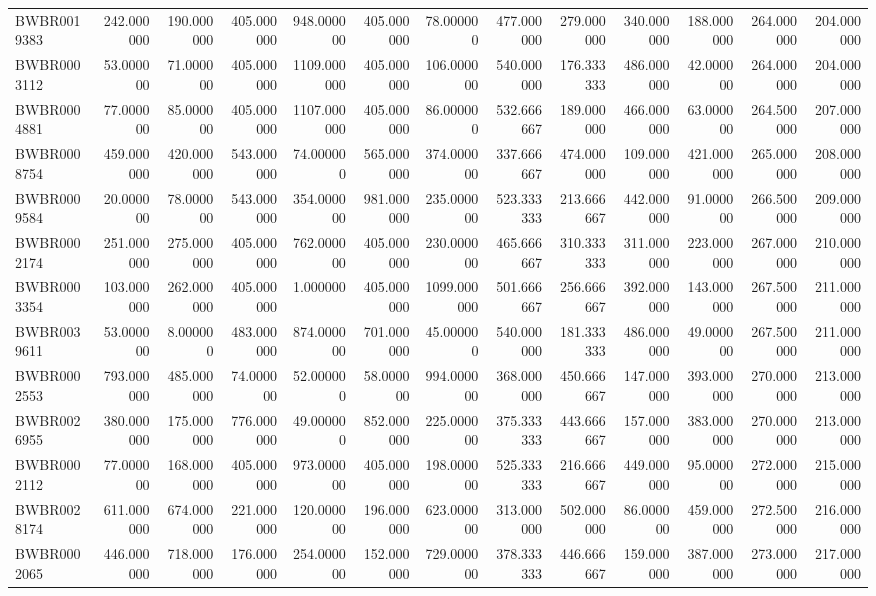\begin{longtable}{lrrrrrrrrrrrr}
BWBR0019383 & 242.000000 & 190.000000 & 405.000000 & 948.000000 & 405.000000 & 78.000000 & 477.000000 & 279.000000 & 340.000000 & 188.000000 & 264.000000 & 204.000000 \\
BWBR0003112 & 53.000000 & 71.000000 & 405.000000 & 1109.000000 & 405.000000 & 106.000000 & 540.000000 & 176.333333 & 486.000000 & 42.000000 & 264.000000 & 204.000000 \\
BWBR0004881 & 77.000000 & 85.000000 & 405.000000 & 1107.000000 & 405.000000 & 86.000000 & 532.666667 & 189.000000 & 466.000000 & 63.000000 & 264.500000 & 207.000000 \\
BWBR0008754 & 459.000000 & 420.000000 & 543.000000 & 74.000000 & 565.000000 & 374.000000 & 337.666667 & 474.000000 & 109.000000 & 421.000000 & 265.000000 & 208.000000 \\
BWBR0009584 & 20.000000 & 78.000000 & 543.000000 & 354.000000 & 981.000000 & 235.000000 & 523.333333 & 213.666667 & 442.000000 & 91.000000 & 266.500000 & 209.000000 \\
BWBR0002174 & 251.000000 & 275.000000 & 405.000000 & 762.000000 & 405.000000 & 230.000000 & 465.666667 & 310.333333 & 311.000000 & 223.000000 & 267.000000 & 210.000000 \\
BWBR0003354 & 103.000000 & 262.000000 & 405.000000 & 1.000000 & 405.000000 & 1099.000000 & 501.666667 & 256.666667 & 392.000000 & 143.000000 & 267.500000 & 211.000000 \\
BWBR0039611 & 53.000000 & 8.000000 & 483.000000 & 874.000000 & 701.000000 & 45.000000 & 540.000000 & 181.333333 & 486.000000 & 49.000000 & 267.500000 & 211.000000 \\
BWBR0002553 & 793.000000 & 485.000000 & 74.000000 & 52.000000 & 58.000000 & 994.000000 & 368.000000 & 450.666667 & 147.000000 & 393.000000 & 270.000000 & 213.000000 \\
BWBR0026955 & 380.000000 & 175.000000 & 776.000000 & 49.000000 & 852.000000 & 225.000000 & 375.333333 & 443.666667 & 157.000000 & 383.000000 & 270.000000 & 213.000000 \\
BWBR0002112 & 77.000000 & 168.000000 & 405.000000 & 973.000000 & 405.000000 & 198.000000 & 525.333333 & 216.666667 & 449.000000 & 95.000000 & 272.000000 & 215.000000 \\
BWBR0028174 & 611.000000 & 674.000000 & 221.000000 & 120.000000 & 196.000000 & 623.000000 & 313.000000 & 502.000000 & 86.000000 & 459.000000 & 272.500000 & 216.000000 \\
BWBR0002065 & 446.000000 & 718.000000 & 176.000000 & 254.000000 & 152.000000 & 729.000000 & 378.333333 & 446.666667 & 159.000000 & 387.000000 & 273.000000 & 217.000000 \\

\end{longtable}
